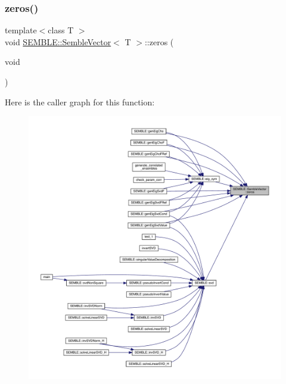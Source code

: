 \mbox{\label{structSEMBLE_1_1SembleVector_a17337e7001050f08298608379aa6504c}} 
\subsubsection{\texorpdfstring{zeros()}{zeros()}\hspace{0.1cm}{\footnotesize\ttfamily [2/2]}}
{\footnotesize\ttfamily template$<$class T $>$ \\
void \mbox{\hyperlink{structSEMBLE_1_1SembleVector}{S\+E\+M\+B\+L\+E\+::\+Semble\+Vector}}$<$ T $>$\+::zeros (\begin{DoxyParamCaption}\item[{void}]{ }\end{DoxyParamCaption})}

Here is the caller graph for this function\+:
\nopagebreak
\begin{figure}[H]
\begin{center}
\leavevmode
\includegraphics[width=350pt]{d9/d94/structSEMBLE_1_1SembleVector_a17337e7001050f08298608379aa6504c_icgraph}
\end{center}
\end{figure}


